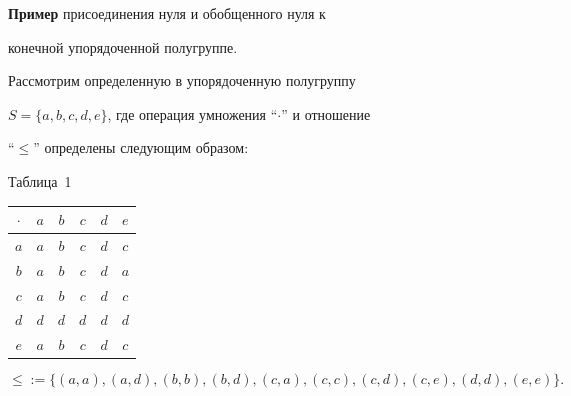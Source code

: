  


{\bf Пример} присоединения нуля и обобщенного нуля к 


конечной упорядоченной полугруппе. 


 


Рассмотрим определенную в \cite{6} упорядоченную полугруппу 


$S=\{a,b,c,d,e\}$, где операция умножения ``$\cdot$'' и отношение 


``$\le$'' определены следующим образом: 


\medskip 





\begin{center} 


Таблица~1 \\


\smallskip 


\begin{tabular}{|c|c|c|c|c|c|} 


\hline 


$\cdot$ & $a$ & $b$ & $c$ & $d$ & $e$ \\ 


\hline 


$a$ & $a$ & $b$ & $c$ & $d$ & $c$ \\ 


\hline 


$b$ & $a$ & $b$ & $c$ & $d$ & $a$ \\ 


\hline 


$c$ & $a$ & $b$ & $c$ & $d$ & $c$ \\ 


\hline 


$d$ & $d$ & $d$ & $d$ & $d$ & $d$ \\ 


\hline 


$e$ & $a$ & $b$ & $c$ & $d$ & $c$ \\ 


\hline 


\end{tabular} 


\end{center} 


$$ 


\le:=\{(a,a),(a,d),(b,b),(b,d),(c,a),(c,c),(c,d),(c,e), 


(d,d),(e,e)\}. 


$$ 


